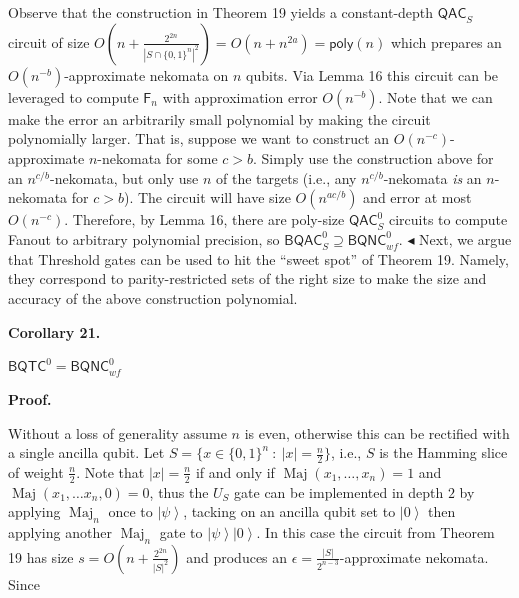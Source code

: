 \documentclass[10pt,a4paper]{article}
\begin{document}
Observe that the construction in Theorem 19 yields a constant-depth ${\mathsf{QAC}}_{S}$ circuit of size $O(n+\frac{2^{2n}}{|S\cap\{0,1\}^{n}|^{2}})=O(n+n^{2a})={\mathsf{poly}}(n)$ which prepares an $O(n^{-b})$-approximate nekomata on $n$ qubits. Via Lemma 16 this circuit can be leveraged to compute $\mathsf{F}_{n}$ with approximation error $O(n^{-b})$. Note that we can make the error an arbitrarily small polynomial by making the circuit polynomially larger. That is, suppose we want to construct an $O(n^{-c})$-approximate $n$-nekomata for some $c>b$. Simply use the construction above for an $n^{c/b}$-nekomata, but only use $n$ of the targets (i.e., any $n^{c/b}$-nekomata \emph{is} an $n$-nekomata for $c>b$). The circuit will have size $O(n^{ac/b})$ and error at most $O(n^{-c})$. Therefore, by Lemma 16, there are poly-size ${\mathsf{QAC}}_{S}^{0}$ circuits to compute Fanout to arbitrary polynomial precision, so ${\mathsf{BQAC}}^{0}_{S}\supseteq{\mathsf{BQNC}}^{0}_{wf}$.
$\blacktriangleleft$
Next, we argue that Threshold gates can be used to hit the “sweet spot” of Theorem 19. Namely, they correspond to parity-restricted sets of the right size to make the size and accuracy of the above construction polynomial.\par





\par\medskip\noindent\textbf{
\textbf{Corollary 21}\textbf{.}
}\par



${\mathsf{BQTC}}^{0}={\mathsf{BQNC}}^{0}_{wf}$\emph{}\par







\par\medskip\noindent\textbf{Proof.}\par




Without a loss of generality assume $n$ is even, otherwise this can be rectified with a single ancilla qubit. Let $S=\{x\in\{0,1\}^{n}\ :\ |x|=\frac{n}{2}\}$, i.e., $S$ is the Hamming slice of weight $\frac{n}{2}$. Note that $|x|=\frac{n}{2}$ if and only if $\operatorname{Maj}(x_{1},\dots,x_{n})=1$ and $\operatorname{Maj}(x_{1},\dots x_{n},0)=0$, thus the $U_{S}$ gate can be implemented in depth $2$ by applying $\operatorname{Maj}_{n}$ once to $\left|\psi\right\rangle$, tacking on an ancilla qubit set to $\left|0\right\rangle$ then applying another $\operatorname{Maj}_{n}$ gate to $\left|\psi\right\rangle\left|0\right\rangle$. In this case the circuit from Theorem 19 has size $s=O(n+\frac{2^{2n}}{|S|^{2}})$ and produces an $\epsilon=\frac{|S|}{2^{n-3}}$-approximate nekomata. Since\par
\end{document}
